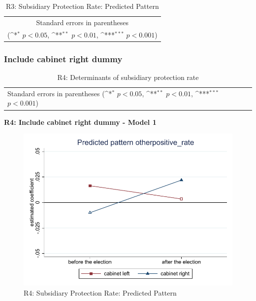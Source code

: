 \documentclass[10pt,a4paper]{scrartcl}
\begin{document}
\begin{table}[!ht]\centering
	\footnotesize
	\renewcommand{\arraystretch}{1.2}
	\def\sym#1{\ifmmode^{#1}\else\(^{#1}\)\fi}
	\caption{R3: Subsidiary Protection Rate: Predicted Pattern}
	\begin{tabular}{l*{2}{c}}
		\hline\hline
		
		\hline\hline
		\multicolumn{3}{c}{\footnotesize Standard errors in parentheses} \\
		\multicolumn{3}{c}{\footnotesize (\sym{*} \(p<0.05\), \sym{**} \(p<0.01\), \sym{***} \(p<0.001\))} \\
	\end{tabular}
\end{table}




\clearpage
\FloatBarrier
\subsubsection{Include cabinet right dummy}
\begin{table}[!ht]\centering
	\renewcommand{\arraystretch}{1.25}
	\small
	\def\sym#1{\ifmmode^{#1}\else\(^{#1}\)\fi}
	\caption{R4: Determinants of subsidiary protection rate}
	\begin{tabular}{l*{3}{c}}
		\hline\hline
		
		\hline\hline
		\multicolumn{4}{l}{\footnotesize Standard errors in parentheses (\sym{*} \(p<0.05\), \sym{**} \(p<0.01\), \sym{***} \(p<0.001\))}\\
	\end{tabular}
\end{table}

\clearpage
\textbf{R4: Include cabinet right dummy - Model 1}
\begin{figure}[!ht]
	\centering
	\includegraphics[width=1\textwidth]{figures_edited/otherpositive_rate_graph1_R4.pdf}
	\caption{R4: Subsidiary Protection Rate: Predicted Pattern}
\end{figure}
\end{document}
